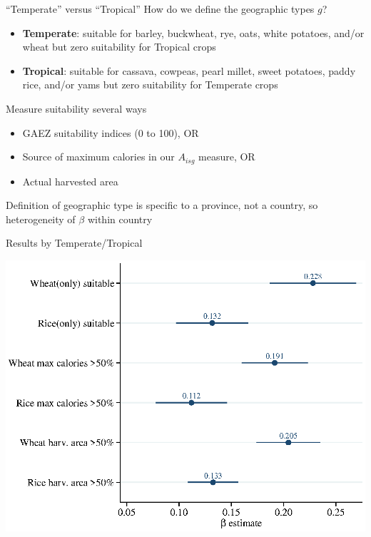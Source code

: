 \documentclass[10pt, xcolor=dvipsnames]{beamer}
\begin{document}
\begin{frame}{``Temperate'' versus ``Tropical''}
How do we define the geographic types $g$?
\begin{itemize}
  \item \textbf{Temperate}: suitable for barley, buckwheat, rye, oats, white potatoes, and/or wheat but zero suitability for Tropical crops
  \item \textbf{Tropical}: suitable for cassava, cowpeas, pearl millet, sweet potatoes, paddy rice, and/or yams but zero suitability for Temperate crops
\end{itemize}
Measure suitability several ways
\begin{itemize}
  \item GAEZ suitability indices (0 to 100), OR
  \item Source of maximum calories in our $A_{isg}$ measure, OR
  \item Actual harvested area
\end{itemize}
Definition of geographic type is specific to a province, not a country, so heterogeneity of $\beta$ within country
\end{frame}


\begin{frame}{Results by Temperate/Tropical}\label{crop}
\begin{center}
\includegraphics[width=.8\textwidth]{fig_coef_crop_base.eps}
\end{center}
\hfill \hyperlink{cropreg}{}
\end{frame}
\end{document}
